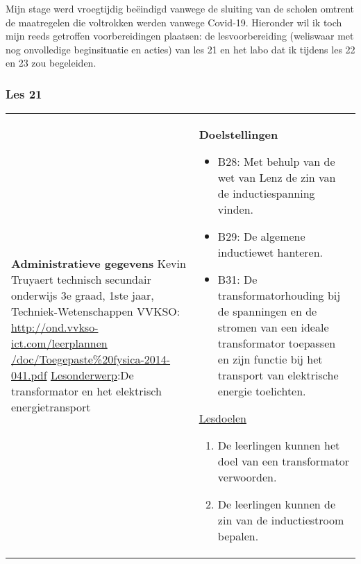 


\begin{landscape}
	Mijn stage werd vroegtijdig beëindigd vanwege de sluiting van de scholen omtrent de maatregelen die voltrokken werden vanwege Covid-19. Hieronder wil ik toch mijn reeds getroffen voorbereidingen plaatsen: de lesvoorbereiding (weliswaar met nog onvolledige beginsituatie en acties) van les 21 en het labo dat ik tijdens les 22 en 23 zou begeleiden.
	
	\subsubsection{Les 21}
	
	\begin{tabularx}{1.56\textwidth}{|p{}|X|}\hline
		\textbf{Administratieve gegevens}\newline\newline
		Kevin Truyaert\newline\newline
		technisch secundair onderwijs\newline
		3e graad, 1ste jaar, Techniek-Wetenschappen\newline
		VVKSO: \href{http://ond.vvkso-ict.com/leerplannen/doc/Toegepaste\%20fysica-2014-041.pdf}{http://ond.vvkso-ict.com/leerplannen /doc/Toegepaste\%20fysica-2014-041.pdf} \newline
		\underline{Lesonderwerp}:\newline De transformator en het elektrisch energietransport  & \textbf{Doelstellingen}
		\begin{itemize}[itemsep=0.08\baselineskip]
			\item B28: Met behulp van de wet van Lenz de zin van de inductiespanning vinden.
			\item B29: De algemene inductiewet hanteren.
			\item B31: De transformatorhouding bij de spanningen en de stromen van een ideale transformator toepassen en zijn functie bij het transport van elektrische energie toelichten.
		\end{itemize}
		\underline{Lesdoelen}\newline
		\vspace{-0.75cm}
		\begin{enumerate}[itemsep=0.08\baselineskip]
			\item De leerlingen kunnen het doel van een transformator verwoorden.
			\item De leerlingen kunnen de zin van de inductiestroom bepalen.

\end{enumerate}
\end{tabularx}
\end{landscape}

